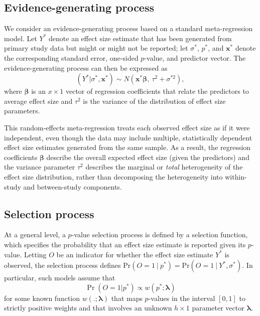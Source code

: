 \documentclass[
  american,
  man, donotrepeattitle,floatsintext]{apa7}
\begin{document}
\subsection{Evidence-generating process}\label{evidence-generating-process}

We consider an evidence-generating process based on a standard meta-regression model.
Let \(Y^*\) denote an effect size estimate that has been generated from primary study data but might or might not be reported; let \(\sigma^*\), \(p^*\), and \(\mathbf{x}^*\) denote the corresponding standard error, one-sided \(p\)-value, and predictor vector.
The evidence-generating process can then be expressed as
\begin{equation}
\label{eq:meta-mean-regression}
\left(Y^* | \sigma^*, \mathbf{x}^*\right) \sim N\left(\mathbf{x}^* \boldsymbol\beta, \ \tau^2 + \sigma^{*2}\right),
\end{equation}
where \(\boldsymbol\beta\) is an \(x \times 1\) vector of regression coefficients that relate the predictors to average effect size and \(\tau^2\) is the variance of the distribution of effect size parameters.

This random-effects meta-regression treats each observed effect size as if it were independent, even though the data may include multiple, statistically dependent effect size estimates generated from the same sample. As a result, the regression coefficients \(\boldsymbol\beta\) describe the overall expected effect size (given the predictors) and the variance parameter \(\tau^2\) describes the marginal or \emph{total} heterogeneity of the effect size distribution, rather than decomposing the heterogeneity into within-study and between-study components.

\subsection{Selection process}\label{selection-process}

At a general level, a \(p\)-value selection process is defined by a selection function, which specifies the probability that an effect size estimate is reported given its \(p\)-value.
Letting \(O\) be an indicator for whether the effect size estimate \(Y^*\) is observed, the selection process defines \(\text{Pr}(O = 1 \ | \ p^*) = \text{Pr}(O = 1 \ | \ Y^*, \sigma^*)\).
In particular, such models assume that
\begin{equation}
\label{eq:selection-process}
\Pr\left(O = 1 | p^* \right) \propto w\left(p^*; \boldsymbol\lambda \right)
\end{equation}
for some known function \(w\left(.; \boldsymbol\lambda\right)\) that maps \(p\)-values in the interval \([0,1]\) to strictly positive weights and that involves an unknown \(h \times 1\) parameter vector \(\boldsymbol\lambda\).
\end{document}
